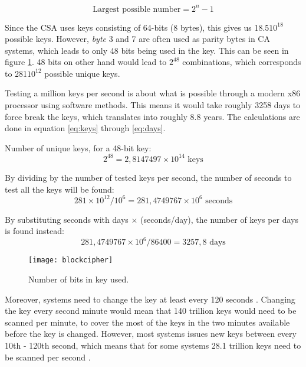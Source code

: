 \begin{equation} 
  \text{Largest possible number} = 2^{n} - 1
  \label{eq:num}
\end{equation}

Since the CSA uses keys consisting of 64-bits (8 bytes), this gives us 
18.5\times$10^{18}$ possible keys. However, \emph{byte} 3 and 
7 are often used as parity bytes in CA systems, which leads to only 48 
bits being used in the key.  This can be seen in figure 
\ref{fig:blockcipher}. 48 bits on other hand would lead to $2^{48}$ 
combinations, which corresponds to 281\times$10^{12}$ possible 
unique keys. 

Testing a million keys per second is about what is possible through a 
modern x86 processor using software methods. This means it would take 
roughly 3258 days to force break the keys, which translates into 
roughly 8.8 years. The calculations are done in equation \ref{eq:keys} 
through \ref{eq:days}. \citep{Breaking:2012}

Number of unique keys, for a 48-bit key:
\begin{equation}
  2^{48} = 2,8147497\times10^{14} \text{ keys}
  \label{eq:keys}
\end{equation}

By dividing by the number of tested keys per second, the number of 
seconds to test all the keys will be found:
\begin{equation}
  281\times10^{12} / 10^{6} = 281,4749767\times10^{6} \text{ seconds}
  \label{eq:seconds}
\end{equation}

By substituting seconds with days $\times$ (seconds/day), the number of 
keys per days is found instead:
\begin{equation}
  281,4749767\times10^{6} / 86400 = 3257,8 \text{ days}
  \label{eq:days}
\end{equation}

\begin{figure}[h!]
  \begin{center}
    \texttt{[image: blockcipher]}
  \end{center}
  \caption{Number of bits in key used.}
  \label{fig:blockcipher}
\end{figure}

Moreover, systems need to change the key at least every 120 seconds 
\citep{Simpson:2009}. Changing the key every second minute would mean 
that 140 trillion keys would need to be scanned per minute, to cover 
the most of the keys in the two minutes available before the key is 
changed. However, most systems issues new keys between every 10th - 
120th second, which means that for some systems 28.1 trillion keys need 
to be scanned per second \citep{Wirt:2004}.

